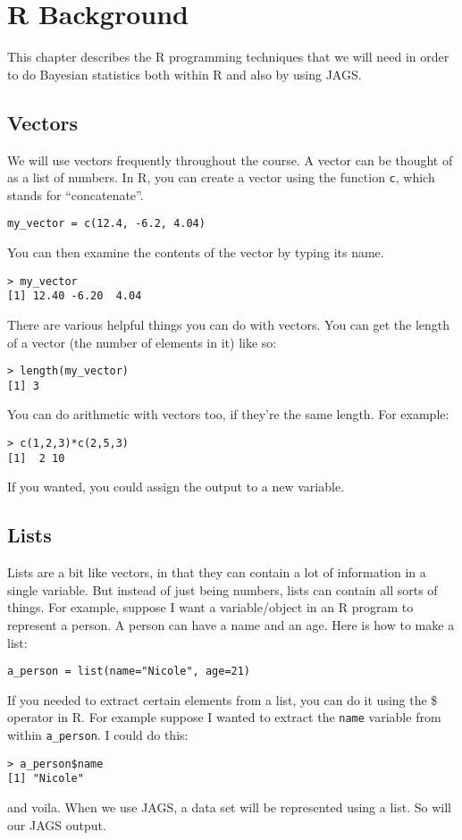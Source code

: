 \chapter{R Background}
This chapter describes the R programming techniques that we will need in order
to do Bayesian statistics both within R and also by using JAGS.

\section{Vectors}
We will use vectors frequently throughout the course. A vector can be thought
of as a list of numbers. In R, you can create a vector using the function
{\tt c}, which stands for ``concatenate''.
\begin{verbatim}
my_vector = c(12.4, -6.2, 4.04)
\end{verbatim}
You can then examine the contents of the vector by typing its name.
\begin{verbatim}
> my_vector
[1] 12.40 -6.20  4.04
\end{verbatim}
There are various helpful things you can do with vectors. You can get the length
of a vector (the number of elements in it) like so:
\begin{verbatim}
> length(my_vector)
[1] 3
\end{verbatim}
You can do arithmetic
with vectors too, if they're the same length. For example:
\begin{verbatim}
> c(1,2,3)*c(2,5,3)
[1]  2 10
\end{verbatim}
If you wanted, you could assign the output to a new variable.

\section{Lists}
Lists are a bit like vectors, in that they can contain a lot of information in
a single variable. But instead of just being numbers, lists can contain all
sorts of things. For example, suppose I want a variable/object in an R program
to represent a person. A person can have a name and an age. Here is how to make
a list:
\begin{verbatim}
a_person = list(name="Nicole", age=21)
\end{verbatim}
If you needed to extract certain elements from a list, you can do it using the
\$ operator in R. For example suppose I wanted to extract the {\tt name} variable
from within {\tt a\_person}. I could do this:
\begin{verbatim}
> a_person$name
[1] "Nicole"
\end{verbatim}
and voila. When we use JAGS, a data set will be represented using a list.
So will our JAGS output.

